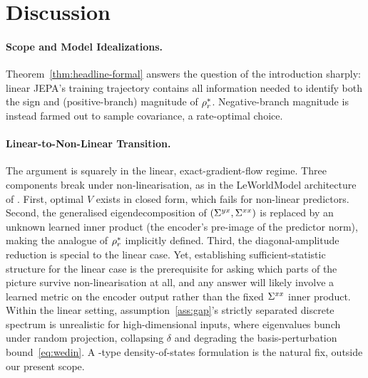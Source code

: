 \section{Discussion}
\label{sec:discussion}

\paragraph{Scope and Model Idealizations.}
Theorem~\ref{thm:headline-formal} answers the question of the
introduction sharply: linear JEPA's training trajectory contains all
information needed to identify both the sign and (positive-branch)
magnitude of $\rho_r^*$. Negative-branch magnitude is instead farmed
out to sample covariance, a rate-optimal choice.

\paragraph{Linear-to-Non-Linear Transition.}
The argument is squarely in the linear, exact-gradient-flow regime.
Three components break under non-linearisation, as in the LeWorldModel architecture of
\citet{Maes2026LeWM}. First,
optimal $V$ exists in closed form, which fails for non-linear
predictors. Second, the generalised eigendecomposition of $(\Sigma^{yx}, \Sigma^{xx})$
is replaced by an unknown learned inner product (the encoder's pre-image
of the predictor norm), making the analogue of $\rho_r^*$ implicitly
defined. Third, the diagonal-amplitude reduction is special to the
linear case.
Yet, establishing sufficient-statistic structure for
the linear case is the prerequisite for asking which parts of the
picture survive non-linearisation at all, and any answer will likely
involve a learned metric on the encoder output rather than the fixed
$\Sigma^{xx}$ inner product.
Within the linear setting, assumption~\ref{ass:gap}'s strictly separated discrete spectrum is
unrealistic for high-dimensional inputs, where eigenvalues bunch under
random projection, collapsing $\delta$ and degrading the
basis-perturbation bound~\eqref{eq:wedin}. A \citet{Marchenko1967}-type
density-of-states formulation is the natural fix, outside our present
scope.

